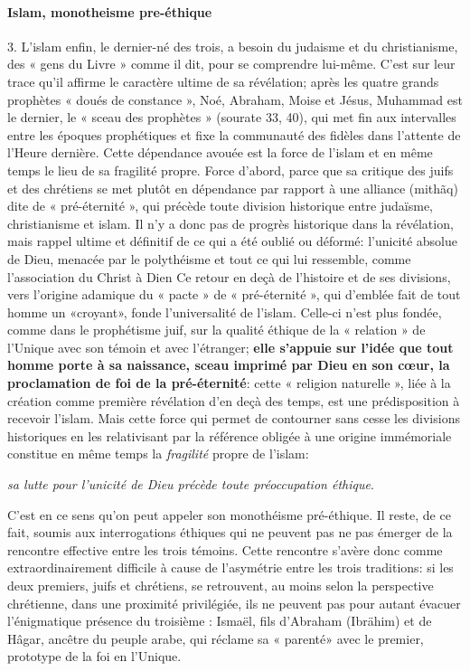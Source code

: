 \paragraph{Islam, monotheisme pre-éthique}
3. L'islam enfin, le dernier-né des trois, a besoin du judaisme et du christianisme, des « gens du Livre » comme il dit, pour se comprendre lui-même. C'est sur leur trace qu'il affirme le caractère ultime de sa révélation; après les quatre grands prophètes « doués de constance », Noé, Abraham, Moise et Jésus, Muhammad est le dernier, le « sceau des prophètes » (sourate 33, 40), qui met fin aux intervalles entre les époques prophétiques et fixe la communauté des fidèles dans l'attente de l'Heure dernière. Cette dépendance avouée est la force de l'islam et en même temps le lieu de sa fragilité propre.
Force d'abord, parce que sa critique des juifs et des chrétiens se met plutôt en dépendance par rapport à une alliance (mithãq) dite de « pré-éternité », qui précède toute division historique entre judaïsme, christianisme et islam. Il n'y a donc pas de progrès historique dans la révélation, mais rappel ultime et définitif de ce qui a été oublié ou déformé: l'unicité absolue de Dieu, menacée par le polythéisme et tout ce qui lui ressemble, comme l'association du Christ à Dien Ce retour en deçà de l'histoire et de ses divisions, vers l'origine adamique du « pacte » de « pré-éternité », qui d'emblée fait de tout homme un «croyant», fonde l'universalité de l'islam. Celle-ci n'est plus fondée, comme dans le prophétisme juif, sur la qualité éthique de la « relation » de l'Unique avec son témoin et avec l'étranger; \textbf{elle s'appuie sur l'idée que tout homme porte à sa naissance, sceau imprimé par Dieu en son cœur, la proclamation de foi de la pré-éternité}: cette « religion naturelle », liée à la création comme première révélation d'en deçà des temps, est une prédisposition à recevoir l'islam.
Mais cette force qui permet de contourner sans cesse les divisions historiques en les relativisant par la référence obligée à une origine immémoriale constitue en même temps la \textit{fragilité} propre de l'islam: 
\begin{Def}
\textit{sa lutte pour l'unicité de Dieu précède toute préoccupation éthique}. 
\end{Def}
C'est en ce sens qu'on peut appeler son monothéisme pré-éthique. Il reste, de ce fait, soumis aux interrogations éthiques qui ne peuvent pas ne pas émerger de la rencontre effective entre les trois témoins.
Cette rencontre s'avère donc comme extraordinairement difficile à cause de l'asymétrie entre les trois traditions: si les deux premiers, juifs et chrétiens, se retrouvent, au moins selon la perspective chrétienne, dans une proximité privilégiée, ils ne peuvent pas pour autant évacuer l'énigmatique présence du troisième : Ismaël, fils d'Abraham (Ibrähim) et de Hâgar, ancêtre du peuple arabe, qui réclame sa « parenté» avec le premier, prototype de la foi en l'Unique.

